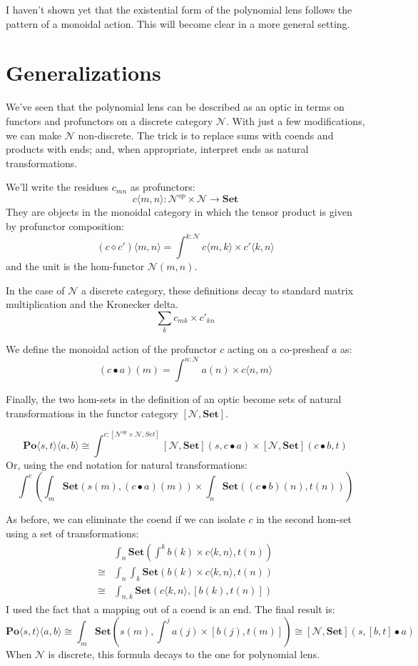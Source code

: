 \documentclass[11pt]{amsart}
\begin{document}
I haven't shown yet that the existential form of the polynomial lens follows the pattern of a monoidal action. This will become clear in a more general setting.

\section{Generalizations}

We've seen that the polynomial lens can be described as an optic in terms on functors and profunctors on a discrete category $\mathcal{N}$. With just a few modifications, we can make $\mathcal{N}$ non-discrete. The trick is to replace sums with coends and products with ends; and, when appropriate, interpret ends as natural transformations. 

We'll write the residues $c_{m n}$ as profunctors:
\[ c \langle m, n \rangle \colon \mathcal{N}^{op} \times \mathcal{N} \to \mathbf{Set} \]
They are objects in the monoidal category in which the tensor product is given by profunctor composition:
\[ (c \diamond c') \langle m, n \rangle = \int^{k \colon \mathcal{N}} c \langle m, k \rangle \times c' \langle k, n \rangle \]
and the unit is the hom-functor $\mathcal{N}(m, n)$. 

In the case of $\mathcal{N}$ a discrete category, these definitions decay to standard matrix multiplication and the Kronecker delta.
\[ \sum_k c_{m k} \times c'_{k n} \]

We define the monoidal action of the profunctor $c$ acting on a co-presheaf $a$ as:
\[(c \bullet a) (m) = \int^{n \colon \mathcal{N}} a(n) \times c \langle n, m \rangle \]

Finally, the two hom-sets in the definition of an optic become sets of natural transformations in the functor category $ [\mathcal{N}, \mathbf{Set}] $. 

\[ \mathbf{Po}\langle s, t\rangle \langle a, b\rangle \cong \int^{c \colon [\mathcal{N}^{op} \times \mathcal{N}, Set]}   [\mathcal{N}, \mathbf{Set}]  \left(s, c \bullet a\right)  \times  [\mathcal{N}, \mathbf{Set}]  \left(c \bullet b, t\right) \]
Or, using the end notation for natural transformations:
\[ \int^{c} \left( \int_m \mathbf{Set}\left(s(m), (c \bullet a)(m)\right)  \times  \int_n \mathbf{Set} \left((c \bullet b)(n), t(n)\right) \right)\]

As before, we can eliminate the coend if we can isolate $c$ in the second hom-set using a set of transformations:
\begin{align*}
 & \int_n  \mathbf{Set} \left(\int^k b(k) \times c\langle k, n \rangle , t(n) \right)
 \\
\cong & \int_n \int_k \mathbf{Set}\left( b(k) \times c\langle k, n \rangle , t (n)\right)
 \\
\cong &  \int_{n, k} \mathbf{Set}\left(c\langle k, n \rangle , [b(k), t (n)]\right)
 \end{align*}
I used the fact that a mapping out of a coend is an end. The final result is:
\[ \mathbf{Po}\langle s, t\rangle \langle a, b\rangle \cong  
\int_m \mathbf{Set}\left(s(m), \int^j a(j) \times [b(j), t(m)] \right) 
\cong [\mathcal{N}, \mathbf{Set}] ( s, [b, t] \bullet a)\]
When $\mathcal{N}$ is discrete, this formula decays to the one for polynomial lens. 
\end{document}
